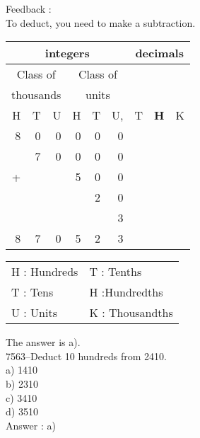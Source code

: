 \documentclass[letterpaper, 12pt]{article}
\begin{document}
Feedback :\\
To deduct, you need to make a subtraction.
\begin{center}
\begin{tabular}{|rrr|rrr|rrr|}
\hline
\multicolumn{6}{|c|}{integers} &\multicolumn{3}{|c|}{decimals} \\
\hline
\multicolumn{3}{|c|}{Class of} &\multicolumn{3}{|c|}{Class of} &  \multicolumn{3}{c|}{} \\
\multicolumn{3}{|c|}{thousands} &\multicolumn{3}{|c|}{units} &  \multicolumn{3}{c|}{} \\
\hline
H & T & U &H & T & U, & T\up{th} & \textbf{H\up{th}} & K\up{th} \\
\hline
\hline
8 & 0 & 0 & 0 & 0 & 0 &  & &\\
 & 7 & 0 & 0 & 0 & 0 &  & &\\
+ &  &  & 5 & 0 & 0 &  & &\\
 &  &  &  & 2 & 0 &  & &\\
 &  &  &  &  & 3 &  & &\\
\hline
\hline
 8 & 7 & 0 & 5 & 2 & 3 &  & &
\\
\hline
\end{tabular}
\end{center}

\scriptsize
\begin{center}
\begin{tabular}{ll}
H : Hundreds & T\up{th} : Tenths\\
T : Tens & H\up{th} :Hundredths\\
U : Units & K\up{e} : Thousandths\\
\end{tabular}
\end{center}

\normalsize
The answer is a).\\





7563--Deduct 10 hundreds from 2410.\\

a) 1410\\
b) 2310\\
c) 3410\\
d) 3510\\

Answer : a)\\
\end{document}
